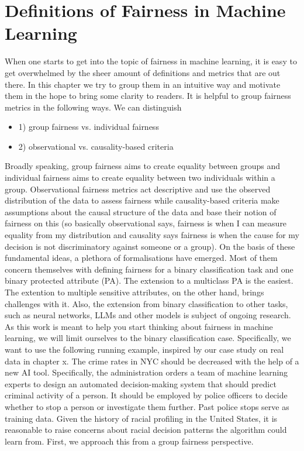 \section*{Definitions of Fairness in Machine Learning}
When one starts to get into the topic of fairness in machine learning, it is easy to get overwhelmed by the sheer amount of definitions and metrics that are out there. In this chapter we try to group them in an intuitive way and motivate them in the hope to bring some clarity to readers. It is helpful to group fairness metrics in the following ways.
We can distinguish
\begin{itemize}
    \item 1) group fairness vs. individual fairness
    \item 2) observational vs. causality-based criteria \cite{castelnovo2022}
\end{itemize}

Broadly speaking, group fairness aims to create equality between groups and individual fairness aims to create equality between two individuals within a group. Observational fairness metrics act descriptive and use the observed distribution of the data to assess fairness while causality-based criteria make assumptions about the causal structure of the data and base their notion of fairness on this (so basically observational says, fairness is when I can measure equality from my distribution and causality says fairness is when the cause for my decision is not discriminatory against someone or a group). On the basis of these fundamental ideas, a plethora of formalisations have emerged. Most of them concern themselves with defining fairness for a binary classification task and one binary protected attribute (PA).
The extension to a multiclass PA is the easiest. The extention to multiple sensitive attributes, on the other hand, brings challenges with it. Also, the extension from binary classification to other tasks, such as neural networks, LLMs and other models is subject of ongoing research. As this work is meant to help you start thinking about fairness in machine learning, we will limit ourselves to the binary classification case.
Specifically, we want to use the following running example, inspired by our case study on real data in chapter x. The crime rates in NYC should be decreased with the help of a new AI tool. Specifically, the administration orders a team of machine learning experts to design an automated decision-making system that should predict criminal activity of a person. It should be employed by police officers to decide whether to stop a person or investigate them further. Past police stops serve as training data. Given the history of racial profiling in the United States, it is reasonable to raise concerns about racial decision patterns the algorithm could learn from. First, we approach this from a group fairness perspective.

